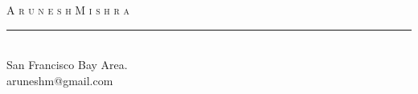 
\setlength{\topmargin}{-0.6in}  %
\setlength{\textheight}{9.3in}  %
\addtolength{\textwidth}{-0.1in}  %
\setlength{\headrulewidth}{0pt} %
\setlength{\headsep}{0.2in}     %
\setlength{\headheight}{12pt}   %

\newdimen\mylinewidth 
\setlength{\mylinewidth}{\resumewidth}
\addtolength{\mylinewidth}{-0.4in}

\def\bull{\vrule height 0.8ex width .7ex depth -.1ex }
\newcommand{\lineunder}{\vspace*{-8pt} \\ \hspace*{-18pt} \rule{\mylinewidth}{0.5pt} \\}
\newcommand{\justline}{\hspace*{-18pt} \hrulefill \\\vspace{4pt}}
\newcommand{\header}[1]{{\hspace*{-15pt}\vspace*{2pt} \large{\textsc{#1}}} \vspace*{-2pt} \lineunder}
\newcommand{\contact}[3]{
\vspace*{-8pt}
\begin{center}
{\LARGE \scshape {#1}}
\lineunder
#2\\
#3
\end{center}
\vspace*{-8pt}
}

\lhead{\hspace*{-\sectionwidth}} %
\cfoot{}  %
\pagestyle{fancy} %
 
\contact{A r u n e s h \hspace{3mm}    M i s h r a}
{  San Francisco Bay Area.}
{aruneshm@gmail.com}
\thispagestyle{empty} %

